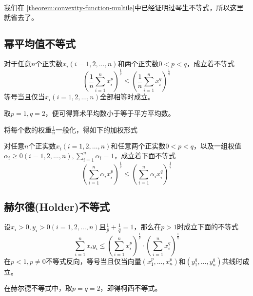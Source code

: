 我们在 \autoref{theorem:convexity-function-multile}中已经证明过琴生不等式，所以这里就省去了。

\subsection{幂平均值不等式}

\begin{theorem}[幂平均值不等式]
  对于任意$n$个正实数$x_i(i=1,2,\ldots,n)$和两个正实数$0<p<q$，成立着不等式
  \begin{equation}
    \label{eq:pow-mean-inequation}
    \left( \frac{1}{n}\sum_{i=1}^nx_i^{p} \right)^{\frac{1}{p}}
    \leqslant \left( \frac{1}{n}\sum_{i=1}^nx_i^{q} \right)^{\frac{1}{q}}
  \end{equation}
  等号当且仅当$x_i(i=1,2,\ldots,n)$全部相等时成立。
\end{theorem}
取$p=1,q=2$，便可得算术平均数小于等于平方平均数。

将每个数的权重$\frac{1}{n}$一般化，得如下的加权形式
\begin{theorem}[加权幂平均值不等式]
  对任意$n$个正实数$x_i(i=1,2,\ldots,n)$和任意两个正实数$0<p<q$，以及一组权值$\alpha_i \geqslant 0(i=1,2,\ldots,n), \sum_{i=1}^n\alpha_i=1$，成立着下面不等式
  \begin{equation}
    \label{eq:pow-mean-inequation-with-weight}
    \left( \sum_{i=1}^n\alpha_ix_i^p \right)^{\frac{1}{p}}
    \leqslant \left( \sum_{i=1}^n\alpha_ix_i^q \right)^{\frac{1}{q}}
  \end{equation}
\end{theorem}

\subsection{赫尔德(Holder)不等式}

\begin{theorem}[赫尔德不等式]
  设$x_i> 0, y_i> 0 (i=1,2,\ldots,n)$且$\frac{1}{p}+\frac{1}{q}=1$，那么在$p>1$时成立下面的不等式
  \begin{equation}
    \label{eq:holder-inequation}
    \sum_{i=1}^nx_iy_i \leqslant \left( \sum_{i=1}^nx_i^p \right)^{\frac{1}{p}} \cdot \left( \sum_{i=1}^nx_i^q \right)^{\frac{1}{q}}
  \end{equation}
  在$p<1,p\neq 0$不等式反向，等号当且仅当向量$(x_1^p,\ldots,x_n^p)$和$(y_1^q,\ldots,y_n^q)$共线时成立。
\end{theorem}
在赫尔德不等式中，取$p=q=2$，即得柯西不等式。

